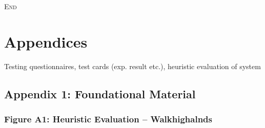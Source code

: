 \documentclass[11pt, english]{article}
\begin{document}
	\vspace{\fill}

	\begin{center}
		\textsc{End}\\
	\end{center}

\newpage



\section*{Appendices}

	Testing questionnaires, test cards (exp. result etc.), heuristic evaluation of system

	\subsection*{Appendix 1: Foundational Material}

		\subsubsection*{Figure A1: Heuristic Evaluation -- Walkhighalnds}
\end{document}
